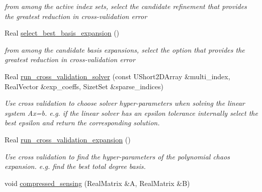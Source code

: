 \begin{DoxyCompactItemize}
\begin{DoxyCompactList}\small\item\em from among the active index sets, select the candidate refinement that provides the greatest reduction in cross-\/validation error \end{DoxyCompactList}\item 
Real \hyperlink{classPecos_1_1RegressOrthogPolyApproximation_a23beef9c5abe68bfe1ff64cb369728f9}{select\+\_\+best\+\_\+basis\+\_\+expansion} ()\label{classPecos_1_1RegressOrthogPolyApproximation_a23beef9c5abe68bfe1ff64cb369728f9}

\begin{DoxyCompactList}\small\item\em from among the candidate basis expansions, select the option that provides the greatest reduction in cross-\/validation error \end{DoxyCompactList}\item 
Real \hyperlink{classPecos_1_1RegressOrthogPolyApproximation_a0aaa35b1fb9133a5debab73eb2a1755a}{run\+\_\+cross\+\_\+validation\+\_\+solver} (const U\+Short2\+D\+Array \&multi\+\_\+index, Real\+Vector \&exp\+\_\+coeffs, Sizet\+Set \&sparse\+\_\+indices)\label{classPecos_1_1RegressOrthogPolyApproximation_a0aaa35b1fb9133a5debab73eb2a1755a}

\begin{DoxyCompactList}\small\item\em Use cross validation to choose solver hyper-\/parameters when solving the linear system Ax=b. e.\+g. if the linear solver has an epsilon tolerance internally select the best epsilon and return the corresponding solution. \end{DoxyCompactList}\item 
Real \hyperlink{classPecos_1_1RegressOrthogPolyApproximation_ac05214a2c0f990429de7bdc84eb6c88f}{run\+\_\+cross\+\_\+validation\+\_\+expansion} ()\label{classPecos_1_1RegressOrthogPolyApproximation_ac05214a2c0f990429de7bdc84eb6c88f}

\begin{DoxyCompactList}\small\item\em Use cross validation to find the hyper-\/parameters of the polynomial chaos expansion. e.\+g. find the \textquotesingle{}best\textquotesingle{} total degree basis. \end{DoxyCompactList}\item 
void \hyperlink{classPecos_1_1RegressOrthogPolyApproximation_a0549317b27b46115434d47120ef4e5e4}{compressed\+\_\+sensing} (Real\+Matrix \&A, Real\+Matrix \&B)\label{classPecos_1_1RegressOrthogPolyApproximation_a0549317b27b46115434d47120ef4e5e4}


\end{DoxyCompactItemize}
